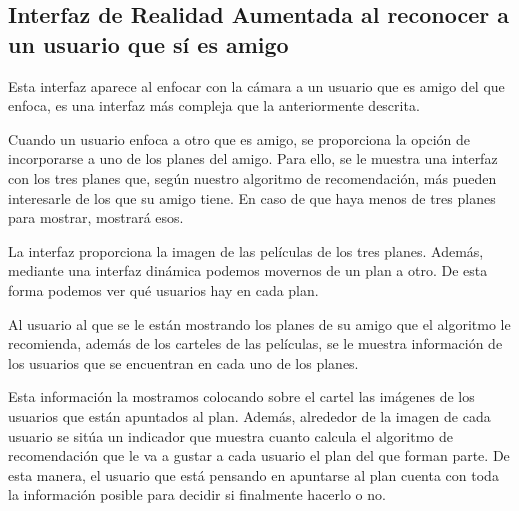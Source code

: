 \subsection{Interfaz de Realidad Aumentada al reconocer a un usuario que sí es amigo}
\label{makereference3.4.5.2}
Esta interfaz aparece al enfocar con la cámara a un usuario que es amigo del que enfoca, 
es una interfaz más compleja que la anteriormente descrita.

Cuando un usuario enfoca a otro que es amigo, se proporciona la opción de incorporarse a uno de los planes del
 amigo. Para ello, se le muestra una interfaz con los tres planes que, según nuestro algoritmo de recomendación,
  más pueden interesarle de los que su amigo tiene. En caso de que haya menos de tres planes para mostrar, mostrará esos.

La interfaz proporciona la imagen de las películas de los tres planes. Además, mediante una interfaz dinámica 
podemos movernos de un plan a otro. De esta forma podemos ver qué usuarios hay en cada plan.

Al usuario al que se le están mostrando los planes de su amigo que el algoritmo le recomienda, además de los carteles de las películas, se le muestra información de los usuarios que se encuentran en cada uno de los planes.

Esta información la mostramos colocando sobre el cartel las imágenes de los usuarios que están apuntados al plan. Además, alrededor de la imagen de cada usuario se sitúa un indicador que muestra cuanto calcula el algoritmo de recomendación que le va a gustar a cada usuario el plan del que forman parte. De esta manera, el usuario que está pensando en apuntarse al plan cuenta con toda la información posible para decidir si finalmente hacerlo o no.


